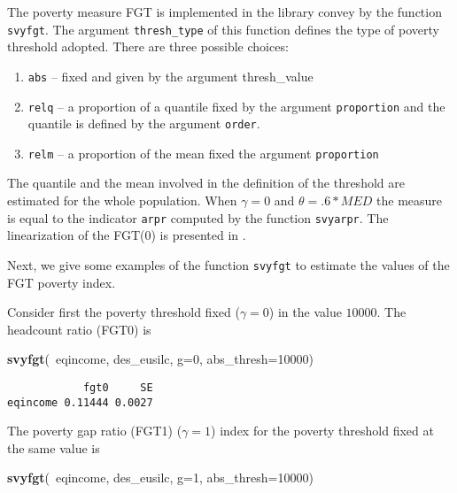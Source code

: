 \documentclass[]{book}
\newenvironment{Shaded}{\begin{snugshade}}{\end{snugshade}}
\newcommand{\KeywordTok}[1]{\textcolor[rgb]{0.13,0.29,0.53}{\textbf{{#1}}}}
\newcommand{\DataTypeTok}[1]{\textcolor[rgb]{0.13,0.29,0.53}{{#1}}}
\newcommand{\DecValTok}[1]{\textcolor[rgb]{0.00,0.00,0.81}{{#1}}}
\newcommand{\NormalTok}[1]{{#1}}
\providecommand{\tightlist}{%
  \setlength{\itemsep}{0pt}\setlength{\parskip}{0pt}}
\begin{document}
The poverty measure FGT is implemented in the library convey by the
function \texttt{svyfgt}. The argument \texttt{thresh\_type} of this
function defines the type of poverty threshold adopted. There are three
possible choices:

\begin{enumerate}
\def\labelenumi{\arabic{enumi}.}
\tightlist
\item
  \texttt{abs} -- fixed and given by the argument thresh\_value
\item
  \texttt{relq} -- a proportion of a quantile fixed by the argument
  \texttt{proportion} and the quantile is defined by the argument
  \texttt{order}.
\item
  \texttt{relm} -- a proportion of the mean fixed the argument
  \texttt{proportion}
\end{enumerate}

The quantile and the mean involved in the definition of the threshold
are estimated for the whole population. When \(\gamma=0\) and
\(\theta= .6*MED\) the measure is equal to the indicator \texttt{arpr}
computed by the function \texttt{svyarpr}. The linearization of the
FGT(0) is presented in \citet{berger2003}.

Next, we give some examples of the function \texttt{svyfgt} to estimate
the values of the FGT poverty index.

Consider first the poverty threshold fixed (\(\gamma=0\)) in the value
\(10000\). The headcount ratio (FGT0) is

\begin{Shaded}
\begin{Highlighting}[]
\KeywordTok{svyfgt}\NormalTok{(~eqincome, des_eusilc, }\DataTypeTok{g=}\DecValTok{0}\NormalTok{, }\DataTypeTok{abs_thresh=}\DecValTok{10000}\NormalTok{)}
\end{Highlighting}
\end{Shaded}

\begin{verbatim}
            fgt0     SE
eqincome 0.11444 0.0027
\end{verbatim}

The poverty gap ratio (FGT1) (\(\gamma=1\)) index for the poverty
threshold fixed at the same value is

\begin{Shaded}
\begin{Highlighting}[]
\KeywordTok{svyfgt}\NormalTok{(~eqincome, des_eusilc, }\DataTypeTok{g=}\DecValTok{1}\NormalTok{, }\DataTypeTok{abs_thresh=}\DecValTok{10000}\NormalTok{)}
\end{Highlighting}
\end{Shaded}
\end{document}
